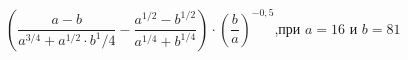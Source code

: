 \begin{ex}[type=simplify_calculate]
	\begin{condition}
		\( \left( \dfrac{a-b}{a^{3/4}+a^{1/2}\cdot b^1/4}-\dfrac{a^{1/2}-b^{1/2}}{a^{1/4}+b^{1/4}} \right)\cdot\left( \dfrac{b}{a} \right)^{-0,5} \),\quad при \( a=16 \) и \( b=81 \)
	\end{condition}
\end{ex}
